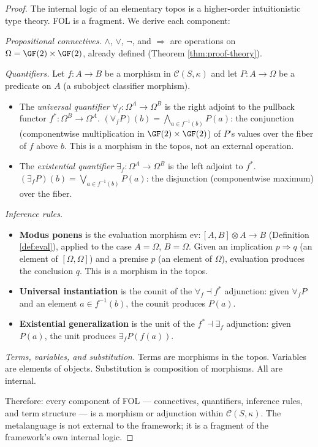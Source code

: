 \begin{proof}
The internal logic of an elementary topos is a
higher-order intuitionistic type theory. FOL is a
fragment. We derive each component:

\emph{Propositional connectives.}
$\wedge$, $\vee$, $\neg$, and $\Rightarrow$ are
operations on $\Omega = \GF(2) \times \GF(2)$, already
defined (Theorem \ref{thm:proof-theory}).

\emph{Quantifiers.}
Let $f: A \to B$ be a morphism in $\mathcal{C}(S,\kappa)$
and let $P: A \to \Omega$ be a predicate on $A$ (a
subobject classifier morphism).
\begin{itemize}[nosep]
  \item The \emph{universal quantifier}
    $\forall_f: \Omega^A \to \Omega^B$ is the right adjoint
    to the pullback functor $f^*: \Omega^B \to \Omega^A$.
    $(\forall_f P)(b) = \bigwedge_{a \in f^{-1}(b)} P(a)$:
    the conjunction (componentwise multiplication in
    $\GF(2) \times \GF(2)$) of $P$'s values over the
    fiber of $f$ above $b$. This is a morphism in the
    topos, not an external operation.
  \item The \emph{existential quantifier}
    $\exists_f: \Omega^A \to \Omega^B$ is the left adjoint
    to $f^*$.
    $(\exists_f P)(b) = \bigvee_{a \in f^{-1}(b)} P(a)$:
    the disjunction (componentwise maximum) over the fiber.
\end{itemize}

\emph{Inference rules.}
\begin{itemize}[nosep]
  \item \textbf{Modus ponens} is the evaluation morphism
    $\mathrm{ev}: [A, B] \otimes A \to B$
    (Definition \ref{def:eval}), applied to the case
    $A = \Omega$, $B = \Omega$. Given an implication
    $p \Rightarrow q$ (an element of $[\Omega, \Omega]$)
    and a premise $p$ (an element of $\Omega$), evaluation
    produces the conclusion $q$. This is a morphism in the
    topos.
  \item \textbf{Universal instantiation} is the counit of
    the $\forall_f \dashv f^*$ adjunction: given
    $\forall_f P$ and an element $a \in f^{-1}(b)$, the
    counit produces $P(a)$.
  \item \textbf{Existential generalization} is the unit of
    the $f^* \dashv \exists_f$ adjunction: given $P(a)$,
    the unit produces $\exists_f P(f(a))$.
\end{itemize}

\emph{Terms, variables, and substitution.}
Terms are morphisms in the topos. Variables are elements
of objects. Substitution is composition of morphisms. All
are internal.

Therefore: every component of FOL --- connectives,
quantifiers, inference rules, and term structure --- is
a morphism or adjunction within $\mathcal{C}(S,\kappa)$.
The metalanguage is not external to the framework; it is
a fragment of the framework's own internal logic.
\end{proof}

